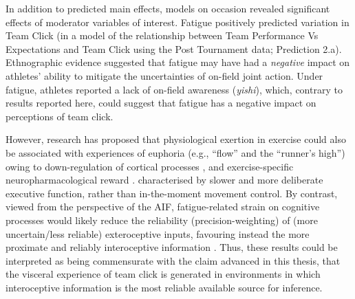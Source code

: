 \begin{CJK}{UTF8}{gbsn}

In addition to predicted main effects, models on occasion revealed significant effects of moderator variables of interest.  Fatigue positively predicted variation in Team Click (in a model of the relationship between Team Performance Vs Expectations and Team Click using the Post Tournament data; Prediction 2.a).  Ethnographic evidence suggested that fatigue may have had a \textit{negative} impact on athletes' ability to mitigate the uncertainties of on-field joint action.  Under fatigue, athletes reported a lack of on-field awareness (\textit{yishi}), which, contrary to results reported here, could suggest that fatigue has a negative impact on perceptions of team click.

However, research has proposed that physiological exertion in exercise could also be associated with experiences of euphoria (e.g., ``flow'' and the ``runner's high'') owing to down-regulation of cortical processes \citep{Dietrich2011}, and exercise-specific neuropharmacological reward \citep{Raichlen2013}.   \citep[i.e., a deliberate ``system 2'' as opposed to more automatic and implicit ``system 1''; see ][]{Kahneman2011} characterised by slower and more deliberate executive function, rather than in-the-moment movement control.  By contrast, viewed from the perspective of the AIF, fatigue-related strain on cognitive processes would likely reduce the reliability (precision-weighting) of (more uncertain/less reliable) exteroceptive inputs, favouring instead the more proximate and reliably interoceptive information \citep{Pezzulo2014}.  Thus, these results could be interpreted as being commensurate with the claim advanced in this thesis, that the visceral experience of team click is generated in environments in which interoceptive information is the most reliable available source for inference.


\end{CJK}
